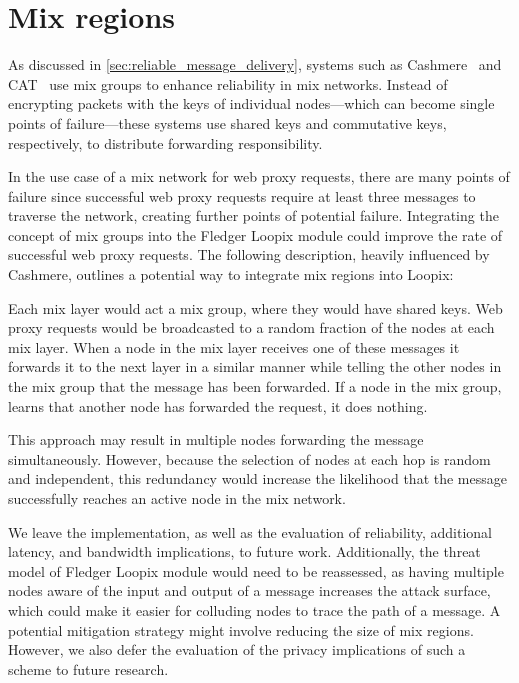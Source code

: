 \documentclass[a4paper,11pt,oneside]{report}
\begin{document}
\section{Mix regions}

As discussed in \autoref{sec:reliable_message_delivery}, systems such as Cashmere~\cite{cashmere} and CAT~\cite{CAT} use mix groups to enhance reliability in mix networks. Instead of encrypting packets with the keys of individual nodes—which can become single points of failure—these systems use shared keys and commutative keys, respectively, to distribute forwarding responsibility.

In the use case of a mix network for web proxy requests, there are many points of failure since successful web proxy requests require at least three messages to traverse the network, creating further points of potential failure. Integrating the concept of mix groups into the Fledger Loopix module could improve the rate of successful web proxy requests. The following description, heavily influenced by Cashmere, outlines a potential way to integrate mix regions into Loopix:

Each mix layer would act a mix group, where they would have shared keys. Web proxy requests would be broadcasted to a random fraction of the nodes at each mix layer. When a node in the mix layer receives one of these messages it forwards it to the next layer in a similar manner while telling the other nodes in the mix group that the message has been forwarded. If a node in the mix group, learns that another node has forwarded the request, it does nothing.

This approach may result in multiple nodes forwarding the message simultaneously. However, because the selection of nodes at each hop is random and independent, this redundancy would increase the likelihood that the message successfully reaches an active node in the mix network.

We leave the implementation, as well as the evaluation of reliability, additional latency, and bandwidth implications, to future work. Additionally, the threat model of Fledger Loopix module would need to be reassessed, as having multiple nodes aware of the input and output of a message increases the attack surface, which could make it easier for colluding nodes to trace the path of a message. A potential mitigation strategy might involve reducing the size of mix regions. However, we also defer the evaluation of the privacy implications of such a scheme to future research.
\end{document}
